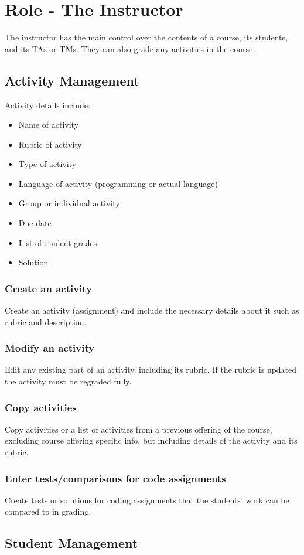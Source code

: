 \documentclass{article}
\begin{document}
\section{Role - The Instructor}
The instructor has the main control over the contents of a course, its students, 
and its TAs or TMs. They can also grade any activities in the course.
\subsection{Activity Management}
Activity details include:
\begin {itemize}
	\item Name of activity
	\item Rubric of activity
	\item Type of activity
	\item Language of activity (programming or actual language)
	\item Group or individual activity
	\item Due date
	\item List of student grades
	\item Solution
\end {itemize}
\subsubsection{Create an activity}
Create an activity (assignment) and include the necessary details about it such 
as rubric and description.
\subsubsection{Modify an activity}
Edit any existing part of an activity, including its rubric. If the rubric is updated
the activity must be regraded fully.
\subsubsection{Copy activities}
Copy activities or a list of activities from a previous offering of the course, excluding
course offering specific info, but including details of the activity and its rubric.
\subsubsection{Enter tests/comparisons for code assignments}
Create tests or solutions for coding assignments that the students' work can be compared
to in grading.
\subsection{Student Management}
\end{document}
